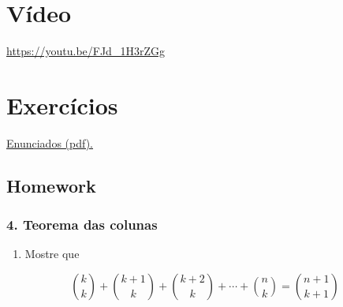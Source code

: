 \documentclass[
  11pt]{report}
\providecommand{\tightlist}{%
  \setlength{\itemsep}{0pt}\setlength{\parskip}{0pt}}
\begin{document}
\hypertarget{vuxeddeo-1}{%
\section*{Vídeo}\label{vuxeddeo-1}}

\begin{center} \url{https://youtu.be/FJd_1H3rZGg} \end{center}

\hypertarget{exercuxedcios-1}{%
\section*{Exercícios}\label{exercuxedcios-1}}

\href{https://projects.iq.harvard.edu/files/stat110/files/strategic_practice_and_homework_1.pdf}{Enunciados (pdf).}

\hypertarget{homework}{%
\subsection*{Homework}\label{homework}}

\hypertarget{teorema-das-colunas}{%
\subsubsection*{4. Teorema das colunas}\label{teorema-das-colunas}}

\begin{rmdbox}

\begin{enumerate}
\def\labelenumi{(\alph{enumi})}
\tightlist
\item
  Mostre que
\end{enumerate}

\[
\binom{k}{k} + \binom{k + 1}{k} + \binom{k + 2}{k} + \cdots + 
\binom{n}{k} = \binom{n + 1}{k + 1}
\]

\end{rmdbox}
\end{document}
